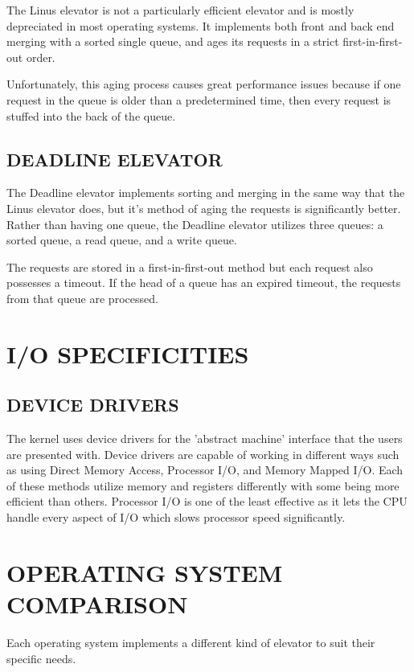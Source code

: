 \documentclass[letterpaper, 10 pt, conference]{ieeeconf}  %
\begin{document}
The Linus elevator is not a particularly efficient elevator and is mostly depreciated in most operating systems. It implements both front and back end merging with a sorted single queue, and ages its requests in a strict first-in-first-out order.\par
Unfortunately, this aging process causes great performance issues because if one request in the queue is older than a predetermined time, then every request is stuffed into the back of the queue.

\subsection{DEADLINE ELEVATOR}

The Deadline elevator implements sorting and merging in the same way that the Linus elevator does, but it's method of aging the requests is significantly better. Rather than having one queue, the Deadline elevator utilizes three queues: a sorted queue, a read queue, and a write queue.\par
The requests are stored in a first-in-first-out method but each request also possesses a timeout. If the head of a queue has an expired timeout, the requests from that queue are processed.

\section{I/O SPECIFICITIES}

\subsection{DEVICE DRIVERS}

The kernel uses device drivers for the 'abstract machine' interface that the users are presented with. Device drivers are capable of working in different ways such as using Direct Memory Access, Processor I/O, and Memory Mapped I/O. Each of these methods utilize memory and registers differently with some being more efficient than others. Processor I/O is one of the least effective as it lets the CPU  handle every aspect of I/O which slows processor speed significantly.  

\section{OPERATING SYSTEM COMPARISON}

Each operating system implements a different kind of elevator to suit their specific needs. 
\end{document}
